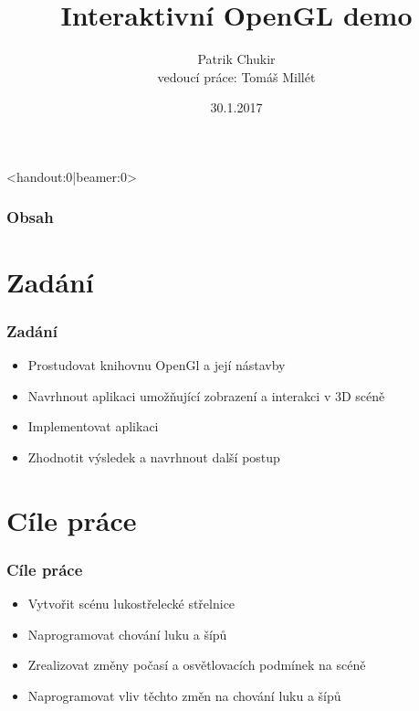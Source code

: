\documentclass{beamer}
\title{Interaktivní
	 OpenGL demo}
\institute{{\large Fakulta informačních technologií\\ VUT}}
\author[Patrik Chukir]{Patrik Chukir\\{\small vedoucí práce: Tomáš Millét}}
\date{{\small 30.1.2017}}
\begin{document}
	\begin{frame}
		<handout:0|beamer:0>
		\frametitle{Obsah}
		\tableofcontents
	\end{frame}
	\frame{\titlepage}
	

	\section{Zadání}
		\begin{frame}
		\frametitle{Zadání}
		\begin{itemize}[<+->]
			\item Prostudovat knihovnu OpenGl a její nástavby
			\item Navrhnout aplikaci umožňující zobrazení a interakci v 3D scéně
			\item Implementovat aplikaci
			\item Zhodnotit výsledek a navrhnout další postup
		\end{itemize}
		\end{frame}
	\section{Cíle práce}
	\begin{frame}
		\frametitle{Cíle práce}
		\begin{itemize}[<+->]
			\item Vytvořit scénu lukostřelecké střelnice
			\item Naprogramovat chování luku a šípů
			\item Zrealizovat změny počasí a osvětlovacích podmínek na scéně
			\item Naprogramovat vliv těchto změn na chování luku a šípů 
		\end{itemize}
	\end{frame}
\end{document}
